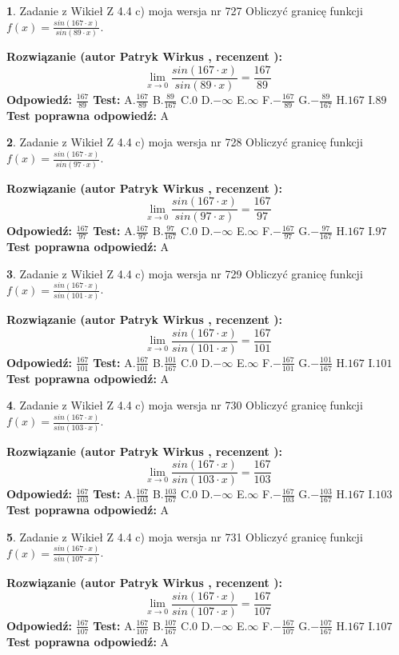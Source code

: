 \documentclass[12pt, a4paper]{article}
\theoremstyle{definition} %
\newtheorem{zad}{}
\newcommand{\zadStart}[1]{\begin{zad}#1\newline}
\newcommand{\zadStop}{\end{zad}}
\newcommand{\rozwStart}[2]{\noindent \textbf{Rozwiązanie (autor #1 , recenzent #2): }\newline}
\newcommand{\rozwStop}{\newline}
\newcommand{\odpStart}{\noindent \textbf{Odpowiedź:}\newline}
\newcommand{\odpStop}{\newline}
\newcommand{\testStart}{\noindent \textbf{Test:}\newline}
\newcommand{\testStop}{\newline}
\newcommand{\kluczStart}{\noindent \textbf{Test poprawna odpowiedź:}\newline}
\newcommand{\kluczStop}{\newline}
\begin{document}
\zadStart{Zadanie z Wikieł Z 4.4 c) moja wersja nr 727}
Obliczyć granicę funkcji $f(x)=\frac{sin(167\cdot x)}{sin(89\cdot x)}$.
\zadStop
\rozwStart{Patryk Wirkus}{}
$$\lim\limits_{x\to 0}\frac{sin(167\cdot x)}{sin(89\cdot x)}=
\frac{167}{89}$$
\rozwStop
\odpStart
$\frac{167}{89}$
\odpStop
\testStart
A.$\frac{167}{89}$
B.$\frac{89}{167}$
C.$0$
D.$-\infty$
E.$\infty$
F.$-\frac{167}{89}$
G.$-\frac{89}{167}$
H.$167$
I.$89$
\testStop
\kluczStart
A
\kluczStop



\zadStart{Zadanie z Wikieł Z 4.4 c) moja wersja nr 728}
Obliczyć granicę funkcji $f(x)=\frac{sin(167\cdot x)}{sin(97\cdot x)}$.
\zadStop
\rozwStart{Patryk Wirkus}{}
$$\lim\limits_{x\to 0}\frac{sin(167\cdot x)}{sin(97\cdot x)}=
\frac{167}{97}$$
\rozwStop
\odpStart
$\frac{167}{97}$
\odpStop
\testStart
A.$\frac{167}{97}$
B.$\frac{97}{167}$
C.$0$
D.$-\infty$
E.$\infty$
F.$-\frac{167}{97}$
G.$-\frac{97}{167}$
H.$167$
I.$97$
\testStop
\kluczStart
A
\kluczStop



\zadStart{Zadanie z Wikieł Z 4.4 c) moja wersja nr 729}
Obliczyć granicę funkcji $f(x)=\frac{sin(167\cdot x)}{sin(101\cdot x)}$.
\zadStop
\rozwStart{Patryk Wirkus}{}
$$\lim\limits_{x\to 0}\frac{sin(167\cdot x)}{sin(101\cdot x)}=
\frac{167}{101}$$
\rozwStop
\odpStart
$\frac{167}{101}$
\odpStop
\testStart
A.$\frac{167}{101}$
B.$\frac{101}{167}$
C.$0$
D.$-\infty$
E.$\infty$
F.$-\frac{167}{101}$
G.$-\frac{101}{167}$
H.$167$
I.$101$
\testStop
\kluczStart
A
\kluczStop



\zadStart{Zadanie z Wikieł Z 4.4 c) moja wersja nr 730}
Obliczyć granicę funkcji $f(x)=\frac{sin(167\cdot x)}{sin(103\cdot x)}$.
\zadStop
\rozwStart{Patryk Wirkus}{}
$$\lim\limits_{x\to 0}\frac{sin(167\cdot x)}{sin(103\cdot x)}=
\frac{167}{103}$$
\rozwStop
\odpStart
$\frac{167}{103}$
\odpStop
\testStart
A.$\frac{167}{103}$
B.$\frac{103}{167}$
C.$0$
D.$-\infty$
E.$\infty$
F.$-\frac{167}{103}$
G.$-\frac{103}{167}$
H.$167$
I.$103$
\testStop
\kluczStart
A
\kluczStop



\zadStart{Zadanie z Wikieł Z 4.4 c) moja wersja nr 731}
Obliczyć granicę funkcji $f(x)=\frac{sin(167\cdot x)}{sin(107\cdot x)}$.
\zadStop
\rozwStart{Patryk Wirkus}{}
$$\lim\limits_{x\to 0}\frac{sin(167\cdot x)}{sin(107\cdot x)}=
\frac{167}{107}$$
\rozwStop
\odpStart
$\frac{167}{107}$
\odpStop
\testStart
A.$\frac{167}{107}$
B.$\frac{107}{167}$
C.$0$
D.$-\infty$
E.$\infty$
F.$-\frac{167}{107}$
G.$-\frac{107}{167}$
H.$167$
I.$107$
\testStop
\kluczStart
A
\kluczStop
\end{document}
